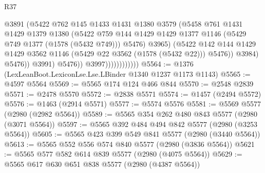 \begin{lexlean}{R37}
\begin{coremodule}
                                        @3891
                                        (@5422
                                          @762
                                          @145
                                          @1433
                                          @1431
                                          @1380
                                          @3579
                                          (@5458
                                            @761
                                            @1431
                                            @1429
                                            @1379
                                            @1380
                                            (@5422
                                              @759
                                              @144
                                              @1429
                                              @1429
                                              @1377
                                              @1146
                                              (@5429 @749 @1377 (@1578 (@5432 @749)))
                                              @5476)
                                            @3965)
                                          (@5422
                                            @142
                                            @144
                                            @1429
                                            @1429
                                            @3562
                                            @1146
                                            (@5429 @22 @3562 (@1578 (@5432 @22)))
                                            @5476))
                                        @3984)
                                      @5476))
                                  @3991)
                                @5476))
                            @3997))))))))))))
@5564 := @1376 (LexLeanBoot.LexiconLse.Lse.LBinder @1340 @1237 @1173 @1143)
@5565 := @4597 @5564
@5569 := @5565 @174 @124 @466 @844
@5570 := @2548 @2839
@5571 := @2478 @5570
@5572 := @2838 @5571
@5574 := @1457 (@2494 @5572)
@5576 := @1463 (@2914 @5571)
@5577 := @5574 @5576
@5581 := @5569 @5577 (@2980 (@2982 @5564))
@5589 := @5565 @354 @262 @480 @843 @5577 (@2980 (@3071 @5564))
@5597 := @5565 @392 @484 @494 @842 @5577 (@2980 (@3253 @5564))
@5605 := @5565 @423 @399 @549 @841 @5577 (@2980 (@3440 @5564))
@5613 := @5565 @552 @556 @574 @840 @5577 (@2980 (@3836 @5564))
@5621 := @5565 @577 @582 @614 @839 @5577 (@2980 (@4075 @5564))
@5629 := @5565 @617 @630 @651 @838 @5577 (@2980 (@4387 @5564))

\end{coremodule}
\end{lexlean}

